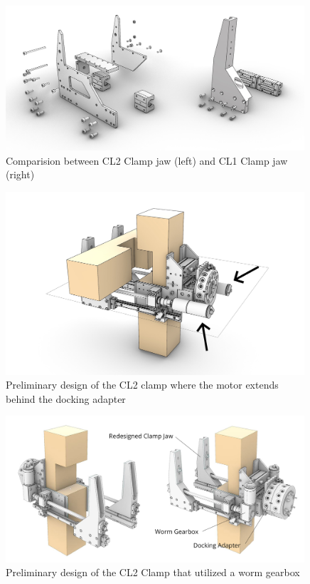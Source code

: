 \begin{figure}
    \centering
    \includegraphics[width=0.99\textwidth]{images/05/image110.jpg}
    \caption[Comparision between CL2 Clamp jaw and CL1 Clamp jaw]
    {Comparision between CL2 Clamp jaw (left) and CL1 Clamp jaw (right)}
    \label{fig:cl2-clamp-jaw}
\end{figure}

\begin{figure}
    \centering
    \includegraphics[width=0.99\textwidth]{images/05/image80.jpg}
    \caption{Preliminary design of the CL2 clamp where the motor extends behind the docking adapter}
    \label{fig:cl2-preliminary-design-1}
\end{figure}


\begin{figure}
    \centering
    \includegraphics[width=0.99\textwidth]{images/05/image60_labels.jpg}
    \caption{Preliminary design of the CL2 Clamp that utilized a worm gearbox}
    \label{fig:cl2-preliminary-design-2}
\end{figure}

